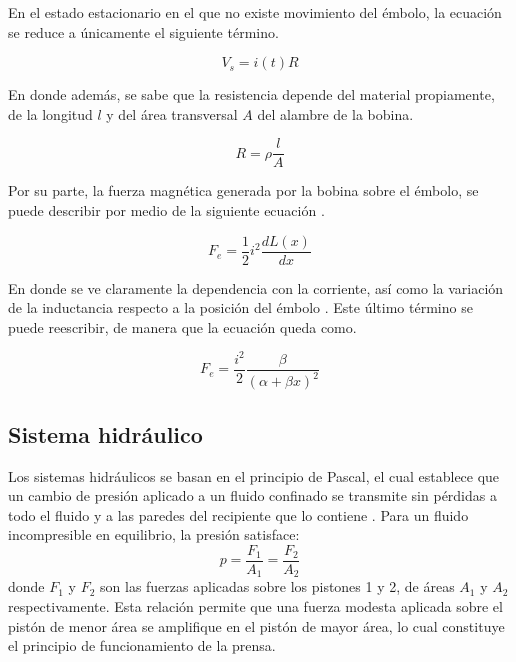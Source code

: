 \documentclass[journal]{IEEEtran}
\begin{document}
En el estado estacionario en el que no existe movimiento del émbolo, 
la ecuación se reduce a únicamente el siguiente término. 

\begin{equation}
    V_s = i(t)R
\end{equation}

En donde además, se sabe que la resistencia depende del material propiamente, de la longitud $l$ y del 
área transversal $A$ del alambre de la bobina. 

\begin{equation}
    R = \rho \frac{l}{A}
\label{eq:resistencia_solenoide}
\end{equation}

Por su parte, la fuerza magnética generada por la bobina sobre el émbolo, se puede describir por medio
de la siguiente ecuación \cite{sadiku2001electromagnetics}.

\begin{equation}
    F_e = \frac{1}{2} i^2 \frac{dL(x)}{dx}
\label{eq:fuerza_magnetica_solenoide}
\end{equation}

En donde se ve claramente la dependencia con la corriente, así como la variación
de la inductancia respecto a la posición del émbolo \cite{mathworks_solenoid}. Este último término se puede reescribir,
de manera que la ecuación queda como.

\begin{equation}
    F_e = \frac{i^2}{2} \frac{\beta}{(\alpha + \beta x)^2}
\label{eq:fuerza_magnetica_solenoide_reescrita}
\end{equation}


\subsection{Sistema hidráulico}
Los sistemas hidráulicos se basan en el principio de Pascal, el cual establece 
que un cambio de presión aplicado a un fluido confinado se transmite sin 
pérdidas a todo el fluido y a las paredes del recipiente que lo contiene 
\cite{PhysicsBook}. Para un fluido incompresible en equilibrio, la presión 
satisface:
\begin{equation}
    p = \frac{F_1}{A_1} = \frac{F_2}{A_2}
\label{eq:pascal}
\end{equation}
donde $F_1$ y $F_2$ son las fuerzas aplicadas sobre los pistones 1 y 2, de 
áreas $A_1$ y $A_2$ respectivamente. Esta relación permite que una fuerza 
modesta aplicada sobre el pistón de menor área se amplifique en el pistón de 
mayor área, lo cual constituye el principio de funcionamiento de la prensa.
\end{document}
